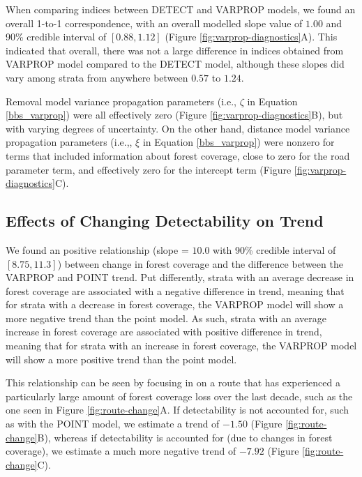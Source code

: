 \documentclass[12pt]{article}
\begin{document}
\par When comparing indices between DETECT and VARPROP models, we found an overall 1-to-1 correspondence, with an overall modelled slope value of $1.00$ and 90\% credible interval of $[0.88, 1.12]$ (Figure \ref{fig:varprop-diagnostics}A).
This indicated that overall, there was not a large difference in indices obtained from VARPROP model compared to the DETECT model, although these slopes did vary among strata from anywhere between $0.57$ to $1.24$.

\par Removal model variance propagation parameters (i.e., $\zeta$ in Equation \ref{bbs_varprop}) were all effectively zero (Figure \ref{fig:varprop-diagnostics}B), but with varying degrees of uncertainty.
On the other hand, distance model variance propagation parameters (i.e.,, $\xi$ in Equation \ref{bbs_varprop}) were nonzero for terms that included information about forest coverage, close to zero for the road parameter term, and effectively zero for the intercept term (Figure \ref{fig:varprop-diagnostics}C).

\subsection{Effects of Changing Detectability on Trend}
\par We found an positive relationship (slope = $10.0$ with 90\% credible interval of $[8.75, 11.3]$) between change in forest coverage and the difference between the VARPROP and POINT trend.
Put differently, strata with an average decrease in forest coverage are associated with a negative difference in trend, meaning that for strata with a decrease in forest coverage, the VARPROP model will show a more negative trend than the point model.
As such, strata with an average increase in forest coverage are associated with positive difference in trend, meaning that for strata with an increase in forest coverage, the VARPROP model will show a more positive trend than the point model.

\par This relationship can be seen by focusing in on a route that has experienced a particularly large amount of forest coverage loss over the last decade, such as the one seen in Figure \ref{fig:route-change}A. 
If detectability is not accounted for, such as with the POINT model, we estimate a trend of $-1.50$ (Figure \ref{fig:route-change}B), whereas if detectability is accounted for (due to changes in forest coverage), we estimate a much more negative trend of $-7.92$ (Figure \ref{fig:route-change}C).
\end{document}
